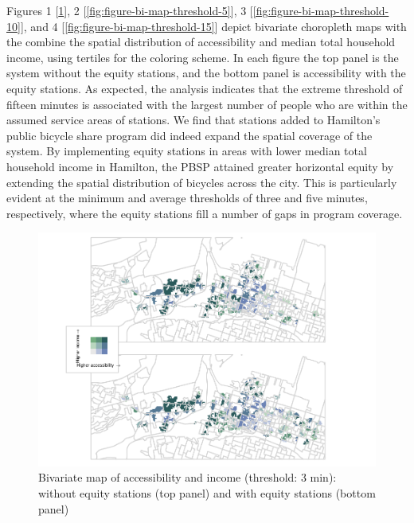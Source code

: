 \documentclass[]{elsarticle} %
\begin{document}
Figures 1 {[}\ref{fig:figure-bi-map-threshold-3}{]}, 2
{[}\ref{fig:figure-bi-map-threshold-5}{]}, 3
{[}\ref{fig:figure-bi-map-threshold-10}{]}, and 4
{[}\ref{fig:figure-bi-map-threshold-15}{]} depict bivariate choropleth
maps with the combine the spatial distribution of accessibility and
median total household income, using tertiles for the coloring scheme.
In each figure the top panel is the system without the equity stations,
and the bottom panel is accessibility with the equity stations. As
expected, the analysis indicates that the extreme threshold of fifteen
minutes is associated with the largest number of people who are within
the assumed service areas of stations. We find that stations added to
Hamilton's public bicycle share program did indeed expand the spatial
coverage of the system. By implementing equity stations in areas with
lower median total household income in Hamilton, the PBSP attained
greater horizontal equity by extending the spatial distribution of
bicycles across the city. This is particularly evident at the minimum
and average thresholds of three and five minutes, respectively, where
the equity stations fill a number of gaps in program coverage.

\begin{figure}
\includegraphics[width=1\linewidth]{Bike-share-spatial-equity_files/figure-latex/figure-bi-map-threshold-3-1} \caption{\label{fig-bivariate-map-threshold-3}Bivariate map of accessibility and income (threshold: 3 min): without equity stations (top panel) and with equity stations (bottom panel)}\label{fig:figure-bi-map-threshold-3}
\end{figure}
\end{document}
